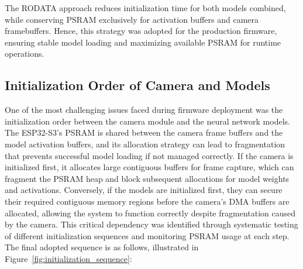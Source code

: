 The RODATA approach reduces initialization time for both models combined, while conserving PSRAM exclusively for activation buffers and camera framebuffers. Hence, this strategy was adopted for the production firmware, ensuring stable model loading and maximizing available PSRAM for runtime operations.



\subsection{Initialization Order of Camera and Models}
\label{subsec:init_order}
One of the most challenging issues faced during firmware deployment was the initialization order between the camera module and the neural network models. The ESP32-S3's PSRAM is shared between the camera frame buffers and the model activation buffers, and its allocation strategy can lead to fragmentation that prevents successful model loading if not managed correctly. If the camera is initialized first, it allocates large contiguous buffers for frame capture, which can fragment the PSRAM heap and block subsequent allocations for model weights and activations. Conversely, if the models are initialized first, they can secure their required contiguous memory regions before the camera's DMA buffers are allocated, allowing the system to function correctly despite fragmentation caused by the camera. This critical dependency was identified through systematic testing of different initialization sequences and monitoring PSRAM usage at each step. The final adopted sequence is as follows, illustrated in  Figure~\ref{fig:initialization_sequence}:


